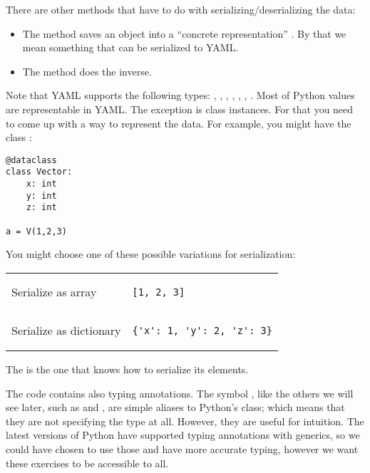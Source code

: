 There are other methods that have to do with serializing/deserializing the data:

\begin{itemize}
    \item The method  saves an object into a ``concrete representation'' \ConcreteRepr.
          By that we mean something that can be serialized to YAML.
    \item The method  does the inverse.
\end{itemize}

Note that YAML supports the following types: , , , ,
, , .
Most of Python values are representable in YAML.
The exception is class instances.
For that you need to come up with a way to represent the data.
For example, you might have the class :

\begin{verbatim}
@dataclass
class Vector:
    x: int
    y: int
    z: int

a = V(1,2,3)
\end{verbatim}

You might choose one of these possible variations for serialization:

\begin{tabular}{ll}
    Serialize as array      &
    \begin{minipage}{4cm}
        \begin{verbatim}
[1, 2, 3]
        \end{verbatim}
    \end{minipage}
    \\
    Serialize as dictionary &
    \begin{minipage}{4cm}
        \begin{verbatim}
{'x': 1, 'y': 2, 'z': 3}
        \end{verbatim}
    \end{minipage}
\end{tabular}

The \Setoid is the one that knows how to serialize its elements.

The code contains also typing annotations.
The symbol \Element, like the others we will see later, such as \Object and \Morphism, are simple aliases to Python's  class; which means that they are not specifying the type at all.
However, they are useful for intuition.
The latest versions of Python have supported typing annotations with generics, so we could have chosen to use those and have more accurate typing, however we want these exercises to be accessible to all.

